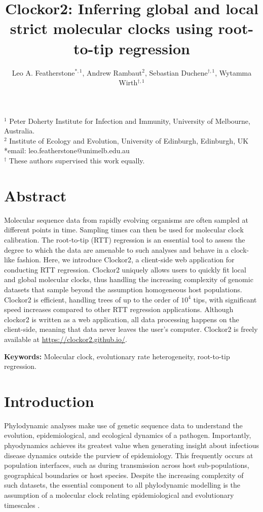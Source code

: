 \documentclass{article}
\title{Clockor2:  Inferring global and local strict molecular clocks using root-to-tip regression}
\author{Leo A. Featherstone$^{\ast,1}$, Andrew Rambaut$^{2}$, Sebastian Duchene$^{\dagger,1}$, Wytamma Wirth$^{\dagger,1}$\\}
\date{}
\begin{document}
\maketitle

$^{1}$ Peter Doherty Institute for Infection and Immunity, University of Melbourne, Australia.\\
$^{2}$ Institute of Ecology and Evolution, University of Edinburgh, Edinburgh, UK\\
*email: leo.featherstone@unimelb.edu.au\\
$^{\dagger}$ These authors supervised this work equally.

\linenumbers
\section*{Abstract}
Molecular sequence data from rapidly evolving organisms are often sampled at different points in time. Sampling times can then be used for molecular clock calibration. The root-to-tip (RTT) regression is an essential tool to assess the degree to which the data are amenable to such analyses and behave in a clock-like fashion. Here, we introduce Clockor2, a client-side web application for conducting RTT regression. Clockor2 uniquely allows users to quickly fit local and global molecular clocks, thus handling the increasing complexity of genomic datasets that sample beyond the assumption homogeneous host populations. Clockor2 is efficient, handling trees of up to the order of $10^4$ tips, with significant speed increases compared to other RTT regression applications. Although clockor2 is written as a web application, all data processing happens on the client-side, meaning that data never leaves the user's computer. Clockor2 is freely available at \url{https://clockor2.github.io/}.

\textbf{Keywords:} Molecular clock, evolutionary rate heterogeneity, root-to-tip regression.

\section*{Introduction}
Phylodynamic analyses make use of genetic sequence data to understand the evolution, epidemiological, and ecological dynamics of a pathogen. Importantly, phyodynamics achieves its greatest value when generating insight about infectious disease dynamics outside the purview of epidemiology. This frequently occurs at population interfaces, such as during transmission across host sub-populations,  geographical boundaries or host species. Despite the increasing complexity of such datasets, the essential component to all phylodynamic modelling is the assumption of a molecular clock relating epidemiological and evolutionary timescales \citep{biek_measurably_2015}.
\end{document}
